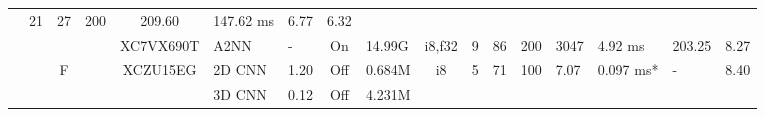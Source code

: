 \documentclass{article}
\begin{document}
\begin{table}
\begin{adjustbox}{totalheight=\baselineskip,}
\begin{tabular}{ccccclp{2em}cp{3em}cp{2em}p{4em}p{3em}p{3.5em}p{3.5em}p{2.5em}p{3em}}
                                       &\multirow{1}{*}{21}
                                           &\multirow{1}{*}{27}
                                               &\multirow{1}{*}{200}
                                                   &\multirow{1}{*}{209.60}
                                                       &\multirow{1}{*}{147.62 ms}
                                                           &\multirow{1}{*}{6.77}
                                                               &\multirow{1}{*}{6.32}\\
\cmidrule{4-17}
   &   &   &\multirow{1}{*}{\cite{zhangExtremelyPipelinedFPGAbased2023a}}
               &\multirow{1}{*}{XC7VX690T}
                   &\multirow{1}{*}{A2NN}
                       &\multirow{1}{*}{-}
                           &\multirow{1}{*}{On}
                               &\multirow{1}{*}{14.99G}
                                   &\multirow{1}{*}{i8,f32}
                                       &\multirow{1}{*}{9}
                                           &\multirow{1}{*}{86}
                                               &\multirow{1}{*}{200}
                                                   &\multirow{1}{*}{3047}
                                                       &\multirow{1}{*}{4.92 ms}
                                                           &\multirow{1}{*}{203.25}
                                                               &\multirow{1}{*}{8.27}\\
\cmidrule{3-17}
   &   &\multirow{13}{*}{F}
           &\multirow{3}{*}{\cite{heConfigurable2D3D2023a}}
               &\multirow{3}{*}{XCZU15EG}
                   &\multirow{1}{*}{2D CNN}
                       &\multirow{1}{*}{1.20}
                           &\multirow{1}{*}{Off}
                               &\multirow{1}{*}{0.684M}
                                   &\multirow{1}{*}{i8}
                                       &\multirow{1}{*}{5}
                                           &\multirow{1}{*}{71}
                                               &\multirow{1}{*}{100}
                                                   &\multirow{1}{*}{7.07}
                                                       &\multirow{1}{*}{0.097 ms*}
                                                           &\multirow{1}{*}{-}
                                                               &\multirow{1}{*}{8.40}\\
   &   &   &   &   &\multirow{1}{*}{3D CNN}
                       &\multirow{1}{*}{0.12}
                           &\multirow{1}{*}{Off}
                               &\multirow{1}{*}{4.231M}

\end{tabular}
\end{adjustbox}
\end{table}
\end{document}
